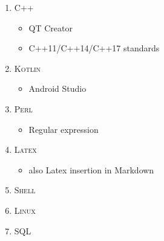 \documentclass[]{report}
\begin{document}
\begin{enumerate}

\item {
	\textsc{C++}
	\begin{itemize}
		\item {QT Creator}
		\item {C++11/C++14/C++17 standards}
	\end{itemize}
}

\item {
	\textsc{Kotlin}
	\begin{itemize}
		\item {Android Studio}
	\end{itemize}
}

\item {\textsc{Perl}
	\begin{itemize}
		\item {Regular expression}
	\end{itemize}
}

\item {
	\textsc{Latex}
	\begin{itemize}
		\item {also Latex insertion in Markdown}   
	\end{itemize}	   		
}

\item {\textsc{Shell}}

\item {\textsc{Linux}}

\item {\textsc{SQL}}

\end{enumerate}
\end{document}
